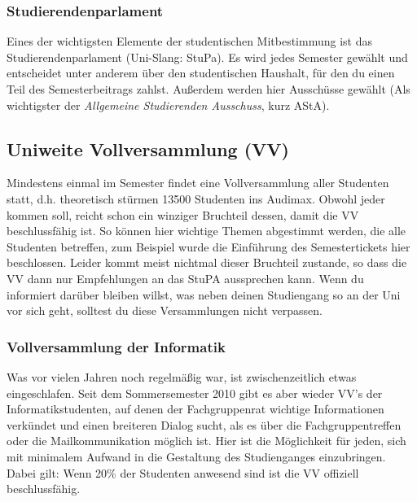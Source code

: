 	\subsubsection*{Studierendenparlament}
		Eines der wichtigsten Elemente der studentischen
		Mitbestimmung ist das Studierendenparlament (Uni-Slang:
		StuPa). Es wird jedes Semester gewählt und entscheidet
		unter anderem über den studentischen Haushalt, für den
		du einen Teil des Semesterbeitrags zahlst. Außerdem werden hier Ausschüsse gewählt (Als wichtigster der \emph{Allgemeine Studierenden Ausschuss}, kurz AStA).
	\subsection*{Uniweite Vollversammlung (VV)}
		Mindestens einmal im Semester findet eine
		Vollversammlung aller Studenten statt, d.h. theoretisch
		stürmen 13500 Studenten ins Audimax. Obwohl jeder kommen
		soll, reicht schon ein winziger Bruchteil dessen, damit
		die VV beschlussfähig ist. So können hier wichtige
		Themen abgestimmt werden, die alle Studenten betreffen,
		zum Beispiel wurde die Einführung des Semestertickets
		hier beschlossen. Leider kommt meist nichtmal dieser
		Bruchteil zustande, so dass die VV dann nur Empfehlungen
		an das StuPA aussprechen kann. Wenn du informiert darüber 
		bleiben willst, was neben deinen Studiengang so an der
		Uni vor sich geht, solltest du diese Versammlungen nicht verpassen.

		\subsubsection*{Vollversammlung der Informatik}
			Was vor vielen Jahren noch regelmäßig war, ist
			zwischenzeitlich etwas eingeschlafen. Seit dem
			Sommersemester 2010 gibt es aber wieder VV's der
			Informatikstudenten, auf denen der
			Fachgruppenrat
			wichtige Informationen verkündet und einen
			breiteren Dialog sucht, als es über die
			Fachgruppentreffen oder die Mailkommunikation
			möglich ist. Hier ist die Möglichkeit für jeden,
			sich mit minimalem Aufwand in die Gestaltung des
			Studienganges einzubringen. Dabei gilt: Wenn
			20\% der Studenten anwesend sind  ist die VV offiziell beschlussfähig.
